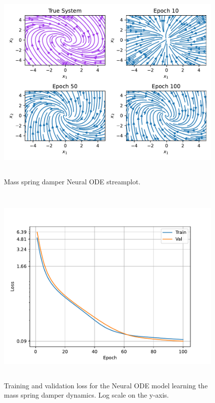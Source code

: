 \documentclass[12pt,a4paper]{book}
\begin{document}
\begin{figure}[H]
    \centering
    \includegraphics[height=10cm]{figs/plots/basic_experiments/mass_spring_damper_node_streamplot_01.pdf}
    \caption{Mass spring damper Neural ODE streamplot.}
    \label{fig:mass_spring_damper_node_streamplot_01}
\end{figure}

\begin{figure}[H]
    \centering
    \includegraphics[height=10cm]{figs/plots/basic_experiments/mass_spring_damper_node_loss_01.pdf}
    \caption{Training and validation loss for the Neural ODE model learning the mass spring damper dynamics. Log scale on the y-axis.}
    \label{fig:mass_spring_damper_node_loss_01}
\end{figure}
\end{document}
